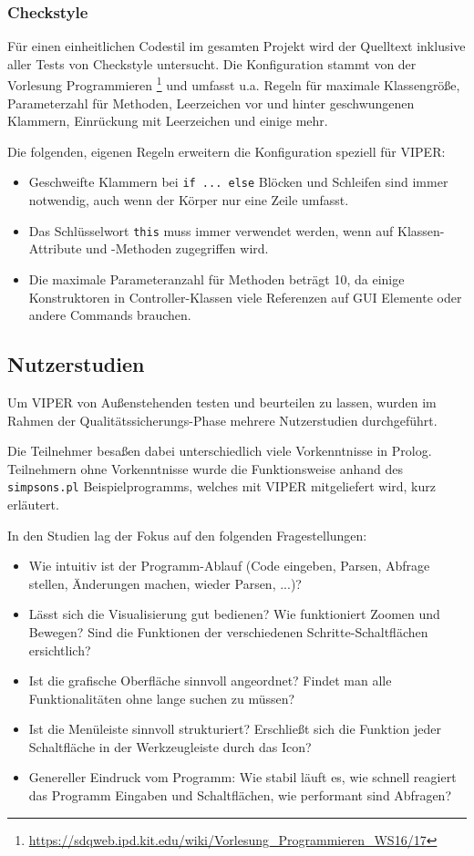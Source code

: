 \documentclass[parskip=full,11pt,twoside]{scrartcl}
\begin{document}
\subsubsection{Checkstyle}

Für einen einheitlichen Codestil im gesamten Projekt wird der Quelltext inklusive aller Tests von Checkstyle untersucht. Die Konfiguration stammt von der Vorlesung Programmieren \footnote{\url{https://sdqweb.ipd.kit.edu/wiki/Vorlesung_Programmieren_WS16/17}} und umfasst u.a. Regeln für maximale Klassengröße, Parameterzahl für Methoden, Leerzeichen vor und hinter geschwungenen Klammern, Einrückung mit Leerzeichen und einige mehr.

Die folgenden, eigenen Regeln erweitern die Konfiguration speziell für VIPER:

\begin{itemize}
  \item Geschweifte Klammern bei \texttt{if ... else} Blöcken und Schleifen sind immer notwendig, auch wenn der Körper nur eine Zeile umfasst.
  \item Das Schlüsselwort \texttt{this} muss immer verwendet werden, wenn auf Klassen-Attribute und -Methoden zugegriffen wird.
  \item Die maximale Parameteranzahl für Methoden beträgt 10, da einige Konstruktoren in Controller-Klassen viele Referenzen auf GUI Elemente oder andere Commands brauchen.
\end{itemize}

\subsection{Nutzerstudien}

Um VIPER von Außenstehenden testen und beurteilen zu lassen, wurden im Rahmen der Qualitätssicherungs-Phase mehrere Nutzerstudien durchgeführt.

Die Teilnehmer besaßen dabei unterschiedlich viele Vorkenntnisse in Prolog. Teilnehmern ohne Vorkenntnisse wurde die Funktionsweise anhand des \texttt{simpsons.pl} Beispielprogramms, welches mit VIPER mitgeliefert wird, kurz erläutert.

In den Studien lag der Fokus auf den folgenden Fragestellungen:

\begin{itemize}
  \item Wie intuitiv ist der Programm-Ablauf (Code eingeben, Parsen, Abfrage stellen, Änderungen machen, wieder Parsen, ...)?
  \item Lässt sich die Visualisierung gut bedienen? Wie funktioniert Zoomen und Bewegen? Sind die Funktionen der verschiedenen Schritte-Schaltflächen ersichtlich?
  \item Ist die grafische Oberfläche sinnvoll angeordnet? Findet man alle Funktionalitäten ohne lange suchen zu müssen?
  \item Ist die Menüleiste sinnvoll strukturiert? Erschließt sich die Funktion jeder Schaltfläche in der Werkzeugleiste durch das Icon?
  \item Genereller Eindruck vom Programm: Wie stabil läuft es, wie schnell reagiert das Programm Eingaben und Schaltflächen, wie performant sind Abfragen?
\end{itemize}
\end{document}
